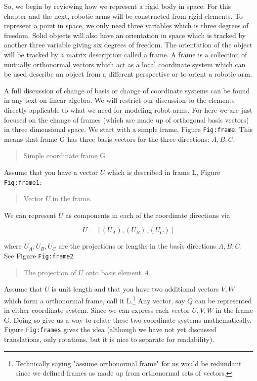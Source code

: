 So, we begin by reviewing how we represent a rigid body in space. For
this chapter and the next, robotic arms will be constructed from rigid
elements. To represent a point in space, we only need three variables
which is three degrees of freedom. Solid objects will also have an
orientation in space which is tracked by another three variable giving
six degrees of freedom. The orientation of the object will be tracked by
a matrix description called a frame. A frame is a collection of mutually
orthonormal vectors which act as a local coordinate system which can be
used describe an object from a different perspective or to orient a
robotic arm.

A full discussion of change of basis or change of coordinate systems can
be found in any text on linear algebra. We will restrict our discussion
to the elements directly applicable to what we need for modeling robot
arms. For here we are just focused on the change of frames (which are
made up of orthogonal basis vectors) in three dimensional space. We
start with a simple frame, Figure \texttt{Fig:frame}. This means that
frame G has three basis vectors for the three directions: \(A, B, C\).

\begin{quote}
Simple coordinate frame G.
\end{quote}

Assume that you have a vector \(U\) which is described in frame L,
Figure \texttt{Fig:frame1}:

\begin{quote}
Vector \(U\) in the frame.
\end{quote}

We can represent \(U\) as components in each of the coordinate
directions via

\[U = [ (U_A) , (U_B) , (U_C)  ]\]

where \(U_A, U_B, U_C\) are the projections or lengths in the basis
directions \(A, B, C\). See Figure \texttt{Fig:frame2}

\begin{quote}
The projection of \(U\) onto basis element \(A\).
\end{quote}

Assume that \(U\) is unit length and that you have two additional
vectors \(V, W\) which form a orthonormal frame, call it L.\footnote{Technically
  saying "assume orthonormal frame" for us would be redundant since we
  defined frames as made up from orthonormal sets of vectors.} Any
vector, say \(Q\) can be represented in either coordinate system. Since
we can express each vector \(U, V, W\) in the frame G. Doing so give us
a way to relate these two coordinate systems mathematically. Figure
\texttt{Fig:frames} gives the idea (although we have not yet discussed
translations, only rotations, but it is nice to separate for
readability).

